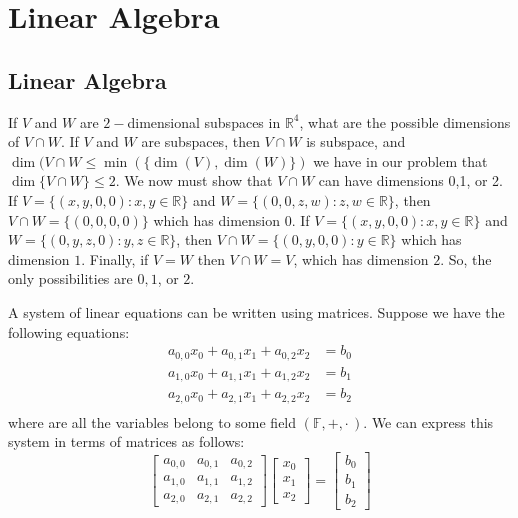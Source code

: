 \chapter{Linear Algebra}
\section{Linear Algebra}
    \begin{lexample}
        If $V$ and $W$ are $2-$dimensional subspaces in $\mathbb{R}^{4}$, what
        are the possible dimensions of $V\cap W$. If $V$ and $W$ are subspaces,
        then ${V}\cap{W}$ is subspace, and
        $\dim({V}\cap{W}\leq\min(\{\dim(V),\dim(W)\})$ we have in our problem
        that $\dim\{V\cap W\}\leq 2$. We now must show that $V\cap W$ can have
        dimensions 0,1, or 2. If $V=\{(x,y,0,0):x,y\in\mathbb{R}\}$ and
        $W=\{(0,0,z,w):z,w\in \mathbb{R}\}$, then ${V}\cap{W}=\{(0,0,0,0)\}$
        which has dimension $0$. If $V=\{(x,y,0,0):x,y\in\mathbb{R}\}$ and
        $W=\{(0,y,z,0):y,z\in\mathbb{R}\}$, then
        ${V}\cap{W}=\{(0,y,0,0):y\in\mathbb{R}\}$ which has dimension $1$.
        Finally, if $V=W$ then ${V}\cap{W}=V$, which has dimension $2$. So, the
        only possibilities are $0,1$, or $2$.
    \end{lexample}
    A system of linear equations can be written using matrices. Suppose we have
    the following equations:
    \begin{align}
        a_{0,0}x_{0}+a_{0,1}x_{1}+a_{0,2}x_{2}&=b_{0}\\
        a_{1,0}x_{0}+a_{1,1}x_{1}+a_{1,2}x_{2}&=b_{1}\\
        a_{2,0}x_{0}+a_{2,1}x_{1}+a_{2,2}x_{2}&=b_{2}\\
    \end{align}
    where are all the variables belong to some field $(\mathbb{F},+,\cdot\,)$.
    We can express this system in terms of matrices as follows:
    \begin{equation}
        \begin{bmatrix}
            a_{0,0}&a_{0,1}&a_{0,2}\\
            a_{1,0}&a_{1,1}&a_{1,2}\\
            a_{2,0}&a_{2,1}&a_{2,2}
        \end{bmatrix}
        \begin{bmatrix}
            x_{0}\\
            x_{1}\\
            x_{2}
        \end{bmatrix}
        =
        \begin{bmatrix}
            b_{0}\\
            b_{1}\\
            b_{2}
        \end{bmatrix}
    \end{equation}
